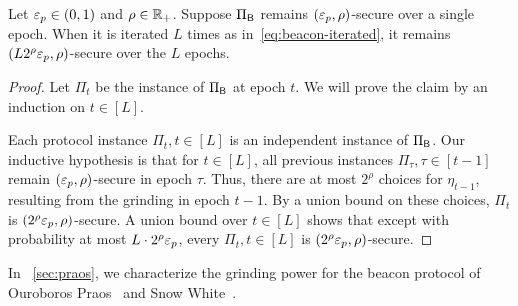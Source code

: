\begin{lemma}\label{lemma:beacon-composition}
Let $\mathsf{\varepsilon}_p \in (0,1)$ and $\rho \in \mathbb{R}_+$.
Suppose $\Pi_{\mathsf{B}}$ remains $(\mathsf{\varepsilon}_p, \rho)$-secure over a single epoch. 
When it is iterated $L$ times as in~\eqref{eq:beacon-iterated}, 
it remains $\left(L 2^\rho \mathsf{\varepsilon}_p, \rho\right)$-secure 
over the $L$ epochs.
\end{lemma}
\begin{proof}
    Let $\Pi_t$ be the instance of $\Pi_{\mathsf{B}}$ at epoch $t$. 
    We will prove the claim by an induction on $t \in [L]$. 

    Each protocol instance $\Pi_t, t \in [L]$ 
    is an independent instance of $\Pi_{\mathsf{B}}$. 
    Our inductive hypothesis is that for $t \in [L]$, 
    all previous instances 
    $\Pi_\tau, \tau \in [t-1]$ remain $(\mathsf{\varepsilon}_p, \rho)$-secure in epoch $\tau$. 
    Thus, there are at most $2^\rho$ choices for $\eta_{t - 1}$, 
    resulting from the grinding in epoch $t-1$.
    By a union bound on these choices, $\Pi_t$ is $(2^\rho \mathsf{\varepsilon}_p, \rho)$-secure. 
    A union bound over $t \in [L]$ shows that 
    except with probability at most $L\cdot 2^\rho \mathsf{\varepsilon}_p$, 
    every $\Pi_t, t \in [L]$ is $(2^\rho \mathsf{\varepsilon}_p, \rho)$-secure.
\end{proof}


In \Section~\ref{sec:praos}, we characterize the grinding power 
for the beacon protocol of Ouroboros Praos~\cite{Praos} and Snow White~\cite{SnowWhite}.






    


